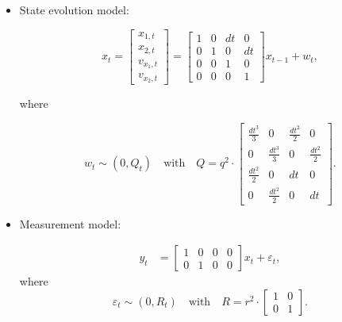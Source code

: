 \begin{itemize}
    \item State evolution model:
    
    \begin{equation}
        x_t = \begin{bmatrix}
        x_{1,t} \\ 
        x_{2,t} \\ 
        v_{x_1,t} \\ 
        v_{x_2,t}
\end{bmatrix}
        = \begin{bmatrix}
       1 & 0 & dt & 0 \\
       0 & 1 & 0 & dt \\
       0 & 0 & 1 &  0 \\
       0 & 0 & 0 &  1 
    \end{bmatrix} x_{t-1} + w_t,
   \end{equation}   
   
    \noident where

    \begin{equation}
        w_t \sim (0, Q_t) \quad \text{with} \quad Q = q^2 \cdot
    \begin{bmatrix}
        \frac{dt^3}{3}    & 0                 & \frac{dt^{2}}{2}  & 0  \\
        0                 & \frac{dt^3}{3}    & 0                 & \frac{dt^{2}}{2} \\
        \frac{dt^{2}}{2}  & 0                 & dt                & 0 \\
        0                 & \frac{dt^{2}}{2}  & 0                 & dt
    \end{bmatrix}.
   \end{equation}

   \item Measurement model:

    \begin{equation}
    \begin{aligned}
    y_t &=  \begin{bmatrix}
        1 & 0 &0 & 0 \\
        0 & 1 &0 & 0
    \end{bmatrix} x_t + \varepsilon_t,
        \end{aligned}
        \label{eq:cvm_measurement_model}
    \end{equation}
    \noident where
    \begin{equation}
        \varepsilon_t \sim (0, R_t) \quad \text{with} \quad R =
    r^{2}\cdot
    \begin{bmatrix}
        1 & 0 \\
        0 & 1
    \end{bmatrix}.
   \end{equation}
    
\end{itemize}

